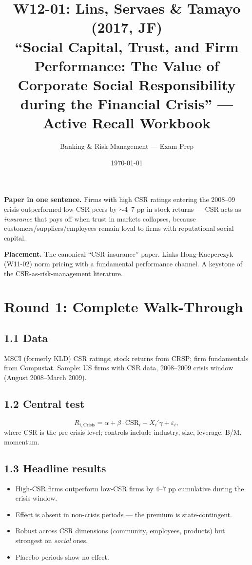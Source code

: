 \documentclass[11pt]{article}
\title{W12-01: Lins, Servaes \& Tamayo (2017, JF) \\
\large ``Social Capital, Trust, and Firm Performance: The Value of Corporate Social Responsibility during the Financial Crisis'' --- Active Recall Workbook}
\author{Banking \& Risk Management --- Exam Prep}
\date{\today}
\begin{document}
\maketitle

\begin{keybox}
\textbf{Paper in one sentence.} Firms with high CSR ratings entering the 2008--09 crisis outperformed low-CSR peers by $\sim$4--7 pp in stock returns --- CSR acts as \emph{insurance} that pays off when trust in markets collapses, because customers/suppliers/employees remain loyal to firms with reputational social capital.

\textbf{Placement.} The canonical ``CSR insurance'' paper. Links Hong-Kacperczyk (W11-02) norm pricing with a fundamental performance channel. A keystone of the CSR-as-risk-management literature.
\end{keybox}

\section*{Round 1: Complete Walk-Through}

\subsection*{1.1 Data}
MSCI (formerly KLD) CSR ratings; stock returns from CRSP; firm fundamentals from Compustat. Sample: US firms with CSR data, 2008--2009 crisis window (August 2008--March 2009).

\subsection*{1.2 Central test}
\[
R_{i,\text{Crisis}}=\alpha+\beta\cdot\text{CSR}_i+X_i'\gamma+\varepsilon_i,
\]
where CSR is the pre-crisis level; controls include industry, size, leverage, B/M, momentum.

\subsection*{1.3 Headline results}
\begin{itemize}
\item High-CSR firms outperform low-CSR firms by 4--7 pp cumulative during the crisis window.
\item Effect is absent in non-crisis periods --- the premium is state-contingent.
\item Robust across CSR dimensions (community, employees, products) but strongest on \emph{social} ones.
\item Placebo periods show no effect.
\end{itemize}
\end{document}
